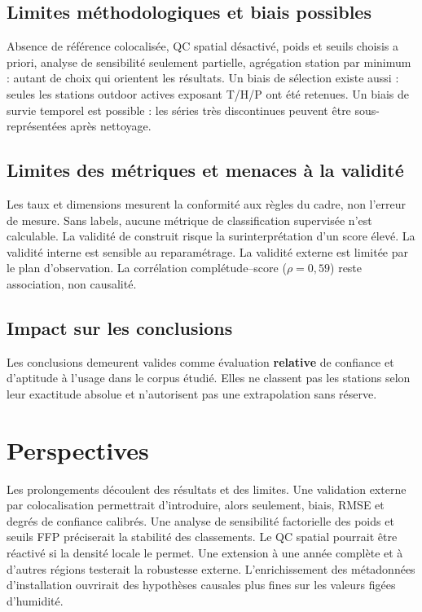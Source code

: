 \subsection{Limites méthodologiques et biais possibles}

Absence de référence colocalisée, QC spatial désactivé, poids et seuils choisis
a priori, analyse de sensibilité seulement partielle, agrégation station par
minimum : autant de choix qui orientent les résultats. Un biais de sélection
existe aussi : seules les stations outdoor actives exposant T/H/P ont été
retenues. Un biais de survie temporel est possible : les séries très
discontinues peuvent être sous-représentées après nettoyage.

\subsection{Limites des métriques et menaces à la validité}

Les taux et dimensions mesurent la conformité aux règles du cadre, non l'erreur
de mesure. Sans labels, aucune métrique de classification supervisée n'est
calculable. La validité de construit risque la surinterprétation d'un score
élevé. La validité interne est sensible au reparamétrage. La validité externe
est limitée par le plan d'observation. La corrélation complétude--score
($\rho=0,59$) reste association, non causalité.

\subsection{Impact sur les conclusions}

Les conclusions demeurent valides comme évaluation \textbf{relative} de
confiance et d'aptitude à l'usage dans le corpus étudié. Elles ne classent pas
les stations selon leur exactitude absolue et n'autorisent pas une extrapolation
sans réserve.

\section{Perspectives}
\label{sec:perspectives}

Les prolongements découlent des résultats et des limites. Une validation
externe par colocalisation permettrait d'introduire, alors seulement, biais,
RMSE et degrés de confiance calibrés. Une analyse de sensibilité factorielle
des poids et seuils FFP préciserait la stabilité des classements. Le QC spatial
pourrait être réactivé si la densité locale le permet. Une extension à une année
complète et à d'autres régions testerait la robustesse externe. L'enrichissement
des métadonnées d'installation ouvrirait des hypothèses causales plus fines sur
les valeurs figées d'humidité.

